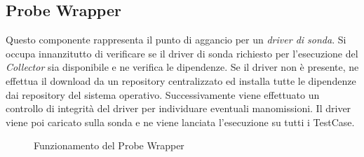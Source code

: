 \documentclass[../main.tex]{subfiles}
\begin{document}
\subsection {Probe Wrapper}
Questo componente rappresenta il punto di aggancio per un \textit{driver di sonda}.
Si occupa innanzitutto di verificare se il driver di sonda richiesto per l'esecuzione del \textit{Collector} sia disponibile e ne verifica le dipendenze. Se il driver non è presente, ne effettua il download da un repository centralizzato ed installa tutte le dipendenze dai repository del sistema operativo.
Successivamente viene effettuato un controllo di integrità del driver per individuare eventuali manomissioni.
Il driver viene poi caricato sulla sonda e ne viene lanciata l'esecuzione su tutti i TestCase.
\begin{figure}[H]
\centering
{}
\caption{Funzionamento del Probe Wrapper}\label{fig:ProbeWrapper}
\end{figure}
\newpage
\end{document}
